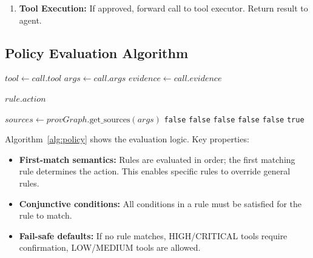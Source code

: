 \begin{enumerate}[leftmargin=1.2em]
  \item \textbf{Tool Execution:} If approved, forward call to tool executor. Return result to agent.
\end{enumerate}

\subsection{Policy Evaluation Algorithm}

\begin{algorithm}[t]
\caption{Policy Evaluation}
\label{alg:policy}
\begin{algorithmic}[1]
  \State $tool \gets call.tool$
  \State $args \gets call.args$
  \State $evidence \gets call.evidence$
  
    
        \State \Return $rule.action$  
      \EndIf
    \EndIf
  \EndFor
  
  \State \Return {}  
\EndProcedure

      \State $sources \gets provGraph.\text{get\_sources}(args)$
        \State \Return \texttt{false}
      \EndIf
        \State \Return \texttt{false}
      \EndIf
        \State \Return \texttt{false}
      \EndIf
        \State \Return \texttt{false}
      \EndIf
        \State \Return \texttt{false}
      \EndIf
    \EndIf
  \EndFor
  \State \Return \texttt{true}  
\EndProcedure
\end{algorithmic}
\end{algorithm}

Algorithm~\ref{alg:policy} shows the evaluation logic. Key properties:
\begin{itemize}[leftmargin=1.2em]
  \item \textbf{First-match semantics:} Rules are evaluated in order; the first matching rule
        determines the action. This enables specific rules to override general rules.
  \item \textbf{Conjunctive conditions:} All conditions in a rule must be satisfied for the rule to match.
  \item \textbf{Fail-safe defaults:} If no rule matches, HIGH/CRITICAL tools require confirmation,
        LOW/MEDIUM tools are allowed.
\end{itemize}

